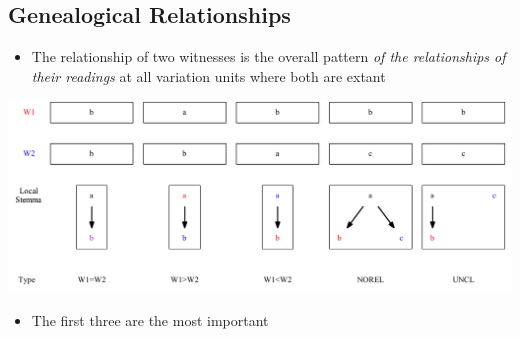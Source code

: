 \documentclass[10pt]{beamer}
\begin{document}
	\subsection{Genealogical Relationships}
	\begin{frame}
		\begin{itemize}
			\item The relationship of two witnesses is the overall pattern \emph{of the relationships of their readings} at all variation units where both are extant
		\end{itemize}
		\begin{center}
			\includegraphics[width=\textwidth]{../img/genealogical-relationships.pdf}
		\end{center}
		\begin{itemize}
			\item The first three are the most important
		\end{itemize}
	\end{frame}
\end{document}
